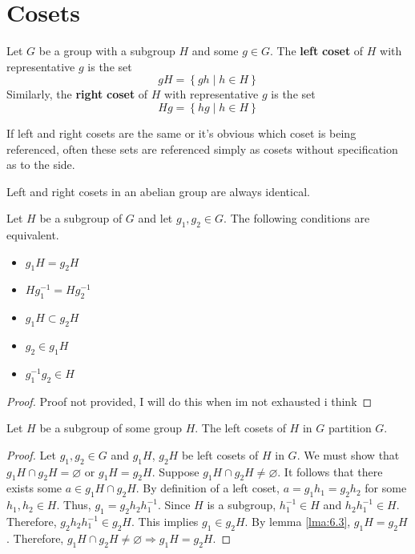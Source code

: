 \documentclass[12pt, letterpaper]{report}
\begin{document}
\section{Cosets}
\begin{definition}[Cosets]
	Let \(G\) be a group with a subgroup \(H\) and some \(g\in G\). The \textbf{left} \textbf{coset} of \(H\) with representative \(g\) is the set
	\[
		gH = \left\{ gh \mid h\in H \right\} 
\]
Similarly, the \textbf{right} \textbf{coset} of \(H\) with representative \(g\) is the set
\[
	Hg = \left\{ hg \mid h\in H \right\} 
\]
\end{definition}
If left and right cosets are the same or it's obvious which coset is being referenced, often these sets are referenced simply as cosets without specification as to the side.
\begin{proposition}
	Left and right cosets in an abelian group are always identical.
\end{proposition}
\begin{lemma}\label{lma:6.3}
	Let \(H\) be a subgroup of \(G\) and let \(g_1,g_2\in G\). The following conditions are equivalent.
	\begin{itemize}
		\item \(g_1 H=g_2 H\)
		\item \(H g^{-1} _1=H g^{-1} _2\)
		\item \(g_1 H \subset g_2 H\)
		\item \(g_2\in g_1 H\)
		\item \(g^{-1} _1 g_2 \in H\)
	\end{itemize}
\end{lemma}
\begin{proof}
	Proof not provided, I will do this when im not exhausted i think
\end{proof}
\begin{theorem}
	Let \(H\) be a subgroup of some group \(H\). The left cosets of \(H\) in \(G\) partition \(G\).
\end{theorem}
\begin{proof}
	Let \(g_1,g_2\in G\) and \(g_1 H\), \(g_2 H\) be left cosets of \(H\) in \(G\). We must show that \(g_1 H \cap g_2 H = \varnothing \) or \(g_1 H = g_2 H\). Suppose \(g_1 H \cap g_2 H \neq \varnothing \). It follows that there exists some \(a\in g_1 H \cap g_2 H\). By definition of a left coset, \(a=g_1 h_1 = g_2 h_2\) for some \(h_1,h_2\in H\). Thus, \(g_1 =g_2 h_2 h^{-1} _1\). Since \(H\) is a subgroup, \(h^{-1} _1\in H\) and \(h_2 h^{-1} _1 \in H\). Therefore, \(g_2 h_2 h^{-1} _1 \in g_2 H\). This implies \(g_1\in g_2 H\). By lemma \ref{lma:6.3}, \(g_1 H = g_2 H\). Therefore, \(g_1 H\cap g_2 H \neq \varnothing \Longrightarrow g_1 H = g_2 H \).
\end{proof}
\end{document}
